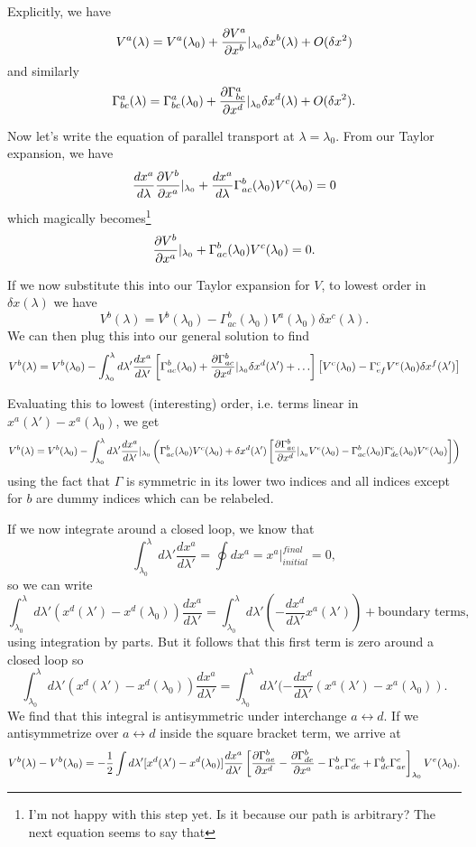 Explicitly, we have
$$V^a(\lambda)=V^a(\lambda_0) + \frac{\partial V^a}{\partial x^b}|_{\lambda_0} \delta x^b(\lambda)+O(\delta x^2)$$
and similarly
$$\Gamma^a_{bc}(\lambda)=\Gamma^a_{bc}(\lambda_0)+\frac{\partial \Gamma^a_{bc}}{\partial x^d}|_{\lambda_0}\delta x^d(\lambda)+O(\delta x^2).$$

Now let's write the equation of parallel transport at $\lambda=\lambda_0.$ From our Taylor expansion, we have
$$\frac{dx^a}{d\lambda}\frac{\partial V^b}{\partial x^a}|_{\lambda_0}+\frac{dx^a}{d\lambda}\Gamma^b_{ac}(\lambda_0)V^c(\lambda_0)=0$$
which magically becomes\footnote{I'm not happy with this step yet. Is it because our path is arbitrary? The next equation seems to say that}
$$\frac{\partial V^b}{\partial x^a}|_{\lambda_0}+\Gamma^b_{ac}(\lambda_0)V^c(\lambda_0)=0.$$

If we now substitute this into our Taylor expansion for $V$, to lowest order in $\delta x(\lambda)$ we have
\begin{equation}\label{lo-paralleltransport}
V^b(\lambda)=V^b(\lambda_0)-\Gamma^b_{ac}(\lambda_0)V^a(\lambda_0)\delta x^c(\lambda).
\end{equation}
We can then plug this into our general solution to find
$$V^b(\lambda)=V^b(\lambda_0) - \int_{\lambda_0}^\lambda d\lambda' \frac{dx^a}{d\lambda'}\left[\Gamma^b_{ac}(\lambda_0)+\frac{\partial \Gamma^b_{ac}}{\partial x^d}|_{\lambda_0} \delta x^d(\lambda')+\ldots\right]\left[V^c(\lambda_0)-\Gamma^c_{ef} V^e(\lambda_0)\delta x^f(\lambda')\right]$$

Evaluating this to lowest (interesting) order, i.e. terms linear in $x^a(\lambda')-x^a(\lambda_0)$, we get
$$V^b(\lambda)=V^b(\lambda_0)
-\int_{\lambda_0}^\lambda d\lambda' \frac{dx^a}{d\lambda'}|_{\lambda_0}
\left(\Gamma^b_{ac}(\lambda_0)V^c(\lambda_0)
+\delta x^d(\lambda')\left[\frac{\partial \Gamma^b_{ae}}{\partial x^d}|_{\lambda_0} V^e(\lambda_0)-\Gamma^b_{ac}(\lambda_0)\Gamma^c_{de}(\lambda_0)V^e(\lambda_0)\right]\right)$$
using the fact that $\Gamma$ is symmetric in its lower two indices and all indices except for $b$ are dummy indices which can be relabeled.

If we now integrate around a closed loop, we know that
$$\int_{\lambda_0}^\lambda d\lambda' \frac{dx^a}{d\lambda'}=\oint dx^a = x^a|_{initial}^{final}=0,$$
so we can write
$$\int_{\lambda_0}^\lambda d\lambda'(x^d(\lambda')-x^d(\lambda_0))\frac{dx^a}{d\lambda'}=\int_{\lambda_0}^\lambda d\lambda'\left(-\frac{dx^d}{d\lambda'}x^a(\lambda')\right)+\text{boundary terms},$$
 using integration by parts. But it follows that this first term is zero around a closed loop so
$$\int_{\lambda_0}^\lambda d\lambda'(x^d(\lambda')-x^d(\lambda_0))\frac{dx^a}{d\lambda'}=\int_{\lambda_0}^\lambda d\lambda'(-\frac{dx^d}{d\lambda'}(x^a(\lambda')-x^a(\lambda_0)).$$
We find that this integral is antisymmetric under interchange $a\leftrightarrow d.$ If we antisymmetrize over $a\leftrightarrow d$ inside the square bracket term, we arrive at
$$V^b(\lambda)-V^b(\lambda_0)=
-\frac{1}{2}\int d\lambda' [x^d(\lambda')-x^d(\lambda_0)]\frac{dx^a}{d\lambda'}
\left[\frac{\partial \Gamma^b_{ae}}{\partial x^d}-\frac{\partial \Gamma^b_{de}}{\partial x^a}-\Gamma^b_{ac}\Gamma^c_{de}+\Gamma^b_{dc}\Gamma^c_{ae}\right]_{\lambda_0}V^e(\lambda_0).$$

